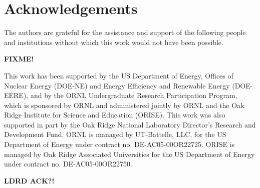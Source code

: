 \section{Acknowledgements}
The authors are grateful for the assistance and support of the following people
and institutions without which this work would not have been possible.

\textbf{FIXME!}

This work has been supported by the US Department of Energy, Offices of Nuclear
Energy (DOE-NE) and Energy Efficiency and Renewable Energy (DOE-EERE), and by
the ORNL Undergraduate Research Participation Program, which is sponsored by
ORNL and administered jointly by ORNL and the Oak Ridge Institute for Science
and Education (ORISE). This work was also supported in part by the Oak Ridge
National Laboratory Director's Research and Development Fund. ORNL is managed by
UT-Battelle, LLC, for the US Department of Energy under contract no.
DE-AC05-00OR22725. ORISE is managed by Oak Ridge Associated Universities for
the US Department of Energy under contract no. DE-AC05-00OR22750.

\textbf{LDRD ACK?!}